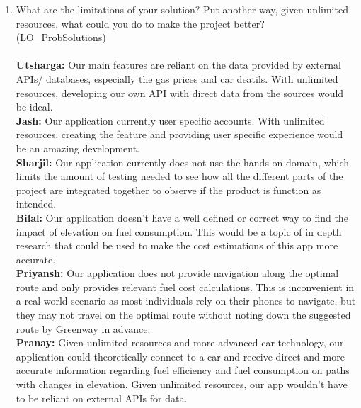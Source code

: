 \documentclass[12pt, titlepage]{article}
\begin{document}
\begin{enumerate}
  \item What are the limitations of your solution?  Put another way, given
  unlimited resources, what could you do to make the project better? (LO\_ProbSolutions)\\ \\
  \textbf{Utsharga:} Our main features are reliant on the data provided by external APIs/ databases, especially the gas prices and car deatils. With unlimited resources, developing our own API with direct data from the sources would be ideal.\\
  \textbf{Jash:} Our application currently user specific accounts. With unlimited resources, creating the feature and providing user specific experience would be an amazing development.\\
  \textbf{Sharjil:} Our application currently does not use the hands-on domain, which limits the amount of testing needed to see how all the different parts of the project are integrated together to observe if the product is function as intended. \\
  \textbf{Bilal:} Our application doesn't have a well defined or correct way to find the impact of elevation on fuel consumption. This would be a topic of in depth research that could be used to make the cost estimations of this app more accurate.\\
  \textbf{Priyansh:} Our application does not provide navigation along the optimal route and only provides relevant fuel cost calculations. This is inconvenient in a real world scenario as most individuals rely on their phones to navigate, but they may not travel on the optimal route without noting down the suggested route by Greenway in advance.\\
  \textbf{Pranay:} Given unlimited resources and more advanced car technology, our application could theoretically connect to a car and receive direct and more accurate information regarding fuel efficiency and fuel consumption on paths with changes in elevation. Given unlimited resources, our app wouldn't have to be reliant on external APIs for data.\\
  

\end{enumerate}
\end{document}
